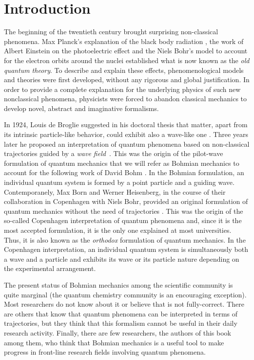 \documentclass[onecolumn,nofootinbib, secnumarabic, amsmath, nobibnotes,12pt,aps,pra]{revtex4-1}
\begin{document}
\section{Introduction}


 The beginning of the twentieth century brought surprising non-classical phenomena. Max Planck's explanation of the black body radiation \cite{om.Planck-BlackBody}, the work of Albert Einstein on the photoelectric effect \cite{om.Einstein-Photoelectric} and the Niels Bohr's model to account for the electron orbits around the nuclei \cite{om.bohr,om.bohr2,om.bohr3} established what is now known as the \textit{old quantum theory}.
To describe and explain these effects, phenomenological models and theories were first developed, without any rigorous and global justification. In order to provide a complete explanation for the underlying physics of such new nonclassical phenomena, physicists were forced to abandon classical mechanics to develop novel, abstract and imaginative formalisms.

In 1924, Louis de Broglie suggested in his doctoral thesis that matter, apart from its intrinsic particle-like behavior, could exhibit also a wave-like one \cite{om.dB_AnnPhys}. Three years later he proposed an interpretation of quantum phenomena based on non-classical trajectories guided by a \emph{wave field}~\cite{om.debroglie1927b}.
This was the origin of the pilot-wave formulation of quantum mechanics that we will refer as Bohmian mechanics to account for the following work of David Bohm \cite{om.bohm1952a,om.bohm1952b}. In the Bohmian formulation, an individual quantum system is formed by a point particle and a guiding wave.
Contemporanely, Max Born and Werner Heisenberg, in the course of their collaboration in Copenhagen with Niels Bohr, provided an original formulation of quantum mechanics without the need of trajectories \cite{om.Born1926,om.Heisenber1925}. This was the origin of the so-called Copenhagen interpretation of quantum phenomena and, since it is the most accepted formulation, it is the only one explained at most universities. Thus, it is also known as the \emph{orthodox} formulation of quantum mechanics. In the Copenhagen interpretation, an individual quantum system is simultaneously both a wave and a particle and exhibits its wave or its particle nature depending on the experimental arrangement.

The present status of Bohmian mechanics among the scientific community is quite marginal (the quantum chemistry community is an encouraging exception). Most researchers do not know about it or believe that is not fully-correct. There are others that know that quantum phenomena can be interpreted in terms of trajectories, but they think that this formalism cannot be useful in their daily research activity. Finally, there are few researchers, the authors of this book among them, who think that Bohmian mechanics is a useful tool to make progress in front-line research fields involving quantum phenomena.
\end{document}
